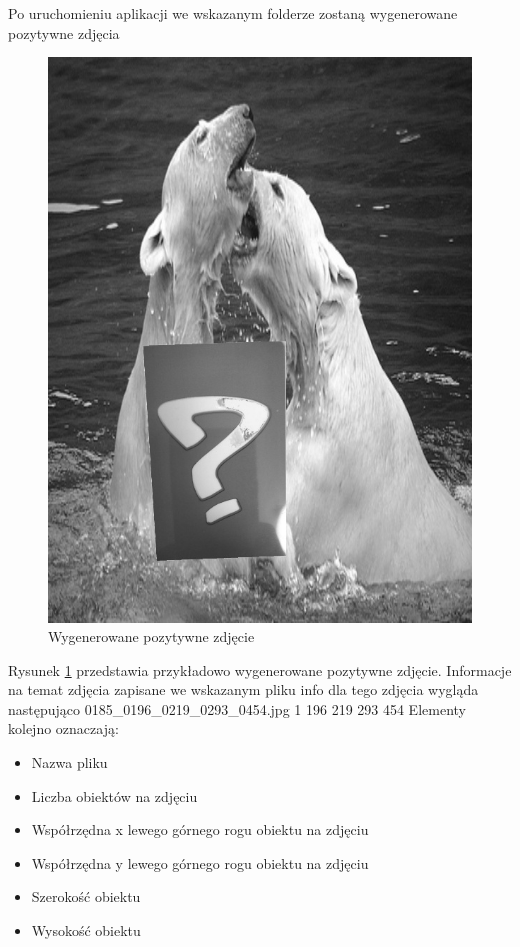 Po uruchomieniu aplikacji we wskazanym folderze zostaną wygenerowane pozytywne zdjęcia 

\begin{figure}[H]
\centering
\includegraphics[scale=0.2]{imgs/0448_0134_0398_0203_0316.png}
\caption{Wygenerowane pozytywne zdjęcie}\label{misie}
\end{figure}

Rysunek \ref{misie} przedstawia przykładowo wygenerowane pozytywne zdjęcie. Informacje na temat zdjęcia zapisane we wskazanym pliku info dla tego zdjęcia wygląda następująco
0185\_0196\_0219\_0293\_0454.jpg 1 196 219 293 454
Elementy kolejno oznaczają:

\begin{itemize}
    \item Nazwa pliku
    \item Liczba obiektów na zdjęciu
    \item Współrzędna x lewego górnego rogu obiektu na zdjęciu
    \item Współrzędna y lewego górnego rogu obiektu na zdjęciu
    \item Szerokość obiektu
    \item Wysokość obiektu

\end{itemize}

